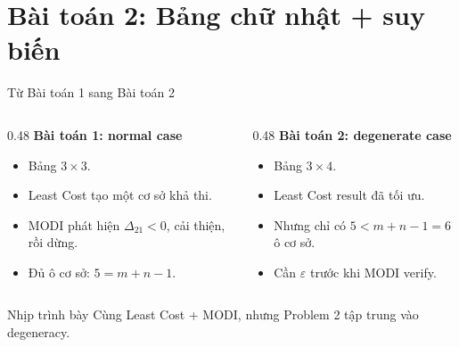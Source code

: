 \documentclass[10pt]{beamer}
\begin{document}
\section{Bài toán 2: Bảng chữ nhật + suy biến}

\begin{frame}{Từ Bài toán 1 sang Bài toán 2}
    \begin{columns}[T]
        \begin{column}{0.48\textwidth}
            \textbf{Bài toán 1: normal case}
            \begin{itemize}
                \item Bảng $3\times 3$.
                \item Least Cost tạo một cơ sở khả thi.
                \item MODI phát hiện $\Delta_{21}<0$, cải thiện, rồi dừng.
                \item Đủ ô cơ sở: $5=m+n-1$.
            \end{itemize}
        \end{column}
        \begin{column}{0.48\textwidth}
            \textbf{Bài toán 2: degenerate case}
            \begin{itemize}
                \item Bảng $3\times 4$.
                \item Least Cost result đã tối ưu.
                \item Nhưng chỉ có $5<m+n-1=6$ ô cơ sở.
                \item Cần $\varepsilon$ trước khi MODI verify.
            \end{itemize}
        \end{column}
    \end{columns}

    \vspace{0.25cm}
    \begin{block}{Nhịp trình bày}
        Cùng Least Cost + MODI, nhưng Problem 2 tập trung vào degeneracy.
    \end{block}
\end{frame}
\end{document}
